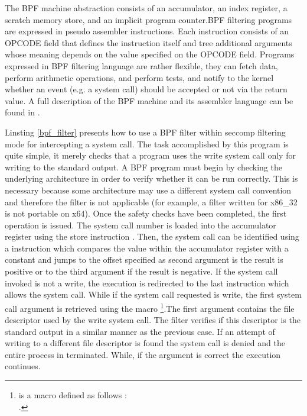 The BPF machine abstraction consists of an accumulator, an index register, a scratch memory store, and an implicit program counter.BPF filtering programs are expressed in pseudo assembler instructions. Each instruction consists of an OPCODE field that defines the instruction itself and tree additional arguments whose meaning depends on the value specified on the OPCODE field.  Programs expressed in BPF filtering language  are rather flexible, they can fetch data, perform arithmetic operations, and perform tests, and notify to the kernel whether an event (e.g. a system call) should be accepted or not via the return value. A full description of the BPF machine and its assembler language can be found in \cite{bpf}.

Linsting \ref{bpf_filter} presents how to use a BPF filter within seccomp filtering mode for intercepting a system call. The task accomplished by this program is quite simple, it merely checks that a program uses the write system call only for writing to the standard output. A BPF program must begin by checking the underlying architecture in order to verify whether it can be run correctly. This is necessary because some architecture may use a different system call convention and therefore the filter is not applicable (for example, a filter written for x86\_32 is not portable on x64). Once the safety checks have been completed, the first operation is issued. The system call number is loaded into the accumulator register using the store instruction . Then, the system call can be identified using a  instruction which compares the value within the accumulator register with a constant and jumps to the offset specified as second argument is the result is positive or to the third argument if the result is negative. If the system call invoked is not a write, the execution is redirected  to the last instruction which allows the system call. While if the system call requested is write, the first system call argument is retrieved using the macro \footnote{ is a macro defined as follows : \\
.
}.The first argument contains the file descriptor used by the write system call.  The filter verifies if this descriptor is the standard output in a similar manner as the previous case. If an attempt of writing to a different file descriptor is found the system call is denied and the entire process in terminated. While, if the argument is correct the execution continues.   

